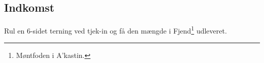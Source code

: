 \subsection{Indkomst}
Rul en 6-sidet terning ved tjek-in og få den mængde i Fjend\footnote{Møntfoden i A'kastin.} udleveret.